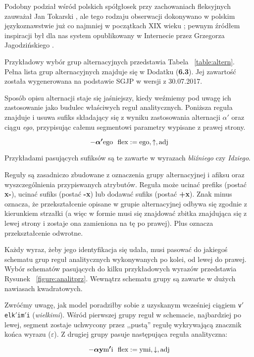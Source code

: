 \documentclass{article}
\begin{document}
Podobny podział wśród polskich spółgłosek przy zachowaniach fleksyjnych zauważał Jan Tokarski \cite{tok1}\cite{tok2}, ale tego rodzaju obserwacji dokonywano w polskim językoznawstwie już co najmniej w początkach XIX wieku \cite{mrozny}; pewnym źródłem inspiracji był dla nas system opublikowany w Internecie przez Grzegorza Jagodzińskiego \cite{jagoda}.

Przykładowy wybór grup alternacyjnych przedstawia Tabela ~\ref{table:altern}.
Pełna lista grup alternacyjnych znajduje się w Dodatku (\textbf{6.3}). Jej zawartość została wygenerowana na podstawie SGJP w wersji z 30.07.2017.
	
Sposób opisu alternacji staje się jaśniejszy, kiedy weźmiemy pod uwagę ich zastosowanie jako budulec właściwych reguł analitycznych.
Poniższa reguła znajduje i usuwa sufiks składający się z wyniku zastosowania alternacji \boldmath$\alpha'$ oraz ciągu \textit{ego},
przypisując całemu segmentowi parametry wypisane z prawej strony.

\[
	-\text{\boldmath$\alpha'$ego} \>\>\> \text{flex}:=\text{ego}, \uparrow, \text{adj}
\]

Przykładami pasujących sufiksów są te zawarte w wyrazach \textit{bliźniego} czy \textit{Idziego}.

Reguły są zasadniczo zbudowane z oznaczenia grupy alternacyjnej i afiksu oraz wyszczególnienia przypiswanych atrybutów.
Reguła może ucinać prefiks (postać \textbf{x-}), ucinać sufiks (postać \textbf{-x}) lub dodawać sufiks (postać \textbf{+x}).
Znak minus oznacza, że przekształcenie opisane w grupie alternacyjnej odbywa się zgodnie z kierunkiem strzałki (a więc w formie musi się znajdować zbitka znajdująca się z lewej strony i zostaje ona zamieniona na tę po prawej).
Plus oznacza przekształcenie odwrotne.

Każdy wyraz, żeby jego identyfikacja się udała, musi pasować do jakiegoś schematu grup reguł analitycznych wykonywanych po kolei, od lewej do prawej.
Wybór schematów pasujących do kilku przykładowych wyrazów przedstawia Rysunek ~\ref{figure:analitprz}. Wewnątrz schematu grupy są zawarte w dużych nawiasach kwadratowych.

Zwróćmy uwagę, jak model poradziłby sobie z uzyskanym wcześniej ciągiem \texttt{v$'$elk$'$im$'$i} (\textit{wielkimi}).
Wśród pierwszej grupy reguł w schemacie, najbardziej po lewej, segment zostaje uchwycony przez ,,pustą'' regułę wykrywającą znacznik końca wyrazu ($\varepsilon$).
Z drugiej grupy pasuje następująca reguła analityczna:

\[
-\text{\boldmath$\alpha${\bf y}m$'$i} \>\>\> \text{flex}:=\text{ymi}, \downarrow, \text{adj}
\]
\end{document}
